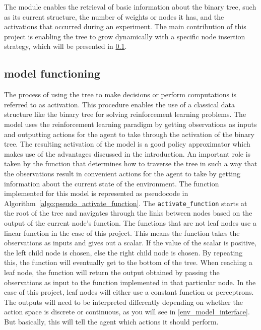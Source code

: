 The module enables the retrieval of basic information about the binary tree, such as its current structure, the number of weights or nodes it has, and the activations that occurred during an experiment. The main contribution of this project is enabling the tree to grow dynamically with a specific node insertion strategy, which will be presented in \ref{model_functioning}.

\subsection{model functioning}
\label{model_functioning}

The process of using the tree to make decisions or perform computations is referred to as activation. This procedure enables the use of a classical data structure like the binary tree for solving reinforcement learning problems. The model uses the reinforcement learning paradigm by getting observations as inputs and outputting actions for the agent to take through the activation of the binary tree. The resulting activation of the model is a good policy approximator which makes use of the advantages discussed in the introduction. An important role is taken by the function that determines how to traverse the tree in such a way that the observations result in convenient actions for the agent to take by getting information about the current state of the environment. The function implemented for this model is represented as pseudocode in Algorithm~\ref{algo:pseudo_activate_function}. The \texttt{activate\_function} starts at the root of the tree and navigates through the links between nodes based on the output of the current node's function. The functions that are not leaf nodes use a linear function in the case of this project. This means the function takes the observations as inputs and gives out a scalar. If the value of the scalar is positive, the left child node is chosen, else the right child node is chosen. By repeating this, the function will eventually get to the bottom of the tree. When reaching a leaf node, the function will return the output obtained by passing the observations as input to the function implemented in that particular node. In the case of this project, leaf nodes will either use a constant function or perceptrons. The outputs will need to be interpreted differently depending on whether the action space is discrete or continuous, as you will see in \ref{env_model_interface}. But basically, this will tell the agent which actions it should perform.

